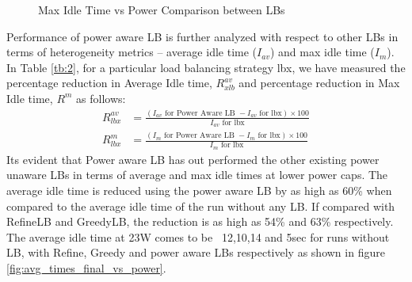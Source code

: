 \begin{figure}
\centering
\caption{Max Idle Time vs Power Comparison between LBs}
\label{fig:idle_times_final_vs_power}
\end{figure}


Performance of power aware LB is further analyzed with respect to other LBs in
terms of heterogeneity metrics – average idle time ($I_{av}$) and max idle time ($I_{m}$).
In Table \ref{tb:2}, for a particular load  balancing strategy lbx, we have measured the percentage reduction in Average Idle time, $R^{av}_{xlb}$ and
percentage reduction in Max Idle time, $R^{m}$ as follows:
\begin{equation} \label{eq:3}
\begin{aligned}
   R^{av}_{lbx} &= \frac{(I_{av} \text{ for Power Aware LB } - I_{av} \text{ for lbx}) \times 100}{I_{av} \text{ for lbx}}  \\
   R^{m}_{lbx}  &= \frac{(I_{m}  \text{ for Power Aware LB } - I_{m}  \text{ for lbx}) \times 100}{I_{m}  \text{ for lbx}}  
\end{aligned}
    \end{equation}
Its evident that Power aware LB has out performed the other existing power
unaware LBs in terms of average and max idle times at lower power caps. The average idle time is
reduced using the power aware LB by as high as 60\% when compared to the
average idle time of the run without any LB. If compared with RefineLB and
GreedyLB, the reduction is as high as 54\% and 63\% respectively. The average
idle time at 23W comes to be ~12,10,14 and 5sec for runs without LB, with
Refine, Greedy and power aware LBs respectively as shown in figure
\ref{fig:avg_times_final_vs_power}.

